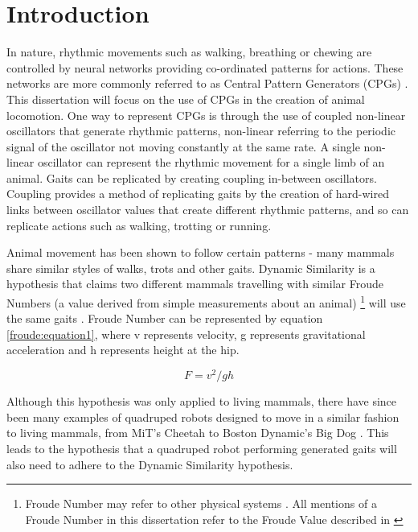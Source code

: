 \chapter{Introduction}

In nature, rhythmic movements such as walking, breathing or chewing are controlled by neural networks providing co-ordinated patterns for actions. These networks are more commonly referred to as Central Pattern Generators (CPGs) \citep{MarderEveBucher2001}. This dissertation will focus  on the use of CPGs in the creation of animal locomotion. One way to represent CPGs is through the use of coupled non-linear oscillators that generate rhythmic patterns, non-linear referring to the periodic signal of the oscillator not moving constantly at the same rate. A single non-linear oscillator can represent the rhythmic movement for a single limb of an animal. Gaits can  be replicated by creating coupling in-between oscillators. Coupling provides a method of replicating gaits by the creation of hard-wired links between oscillator values that create different rhythmic patterns, and so can replicate actions such as walking, trotting or running. 

Animal movement has been shown to follow certain patterns - many mammals share similar styles of walks, trots and other gaits. Dynamic Similarity is a hypothesis that claims two different mammals travelling with similar Froude Numbers (a value derived from simple measurements about an animal) \footnote{Froude Number may refer to other physical systems \citep{Pratt2008}. All mentions of a Froude Number in this dissertation refer to the Froude Value described in \cite{Alexander1983}} will use the same gaits \citep{Alexander1983}. Froude Number can be represented by equation \ref{froude:equation1}, where v represents velocity, g represents gravitational acceleration and h represents height at the hip.

\begin{equation}
F = v^2/gh
\label{froude:equation1}
\end{equation}

Although this hypothesis was only applied to living mammals, there have since been many examples of quadruped robots designed to move in a similar fashion to living mammals, from MiT's Cheetah \citep{Wensing2017} to  Boston Dynamic's Big Dog \citep{Raibert2008}. This leads to the hypothesis that a quadruped robot performing generated gaits will also need to adhere to the Dynamic Similarity hypothesis.


